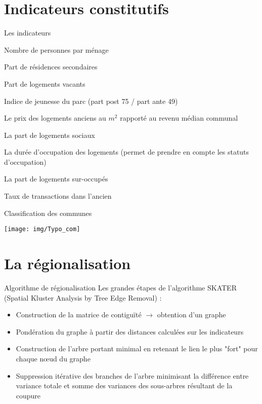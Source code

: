 \documentclass[11pt]{beamer}
\begin{document}
\section{ Indicateurs constitutifs}

\begin{frame}{Les indicateurs}

\begin{enumerate}
\small{
\item Nombre de personnes par ménage
\item Part de résidences secondaires
\item Part de logements vacants
\item Indice de jeunesse du parc (part post 75 / part ante 49)
\item Le prix des logements anciens au $m^2$  rapporté au revenu médian communal
\item La part de logements sociaux
\item La durée d'occupation des logements (permet de prendre en compte les statuts d'occupation)
\item La part de logements sur-occupés
\item Taux de transactions dans l'ancien
}
\end{enumerate}
\end{frame}

\begin{frame}{Classification des communes}
\begin{center}
\texttt{[image: img/Typo\_com]}
\end{center}
\end{frame}


\section{La régionalisation}

\begin{frame}{Algorithme de régionalisation}
Les grandes étapes de l'algorithme SKATER (Spatial Kluster Analysis by Tree Edge Removal) :
\begin{itemize}
\item Construction de la matrice de contiguïté $\rightarrow$ obtention d'un graphe
\item Pondération du graphe à partir des distances calculées sur les indicateurs
\item Construction de l'arbre portant minimal en retenant le lien le plus "fort" pour chaque n\oe ud du graphe 
\item Suppression itérative des branches de l'arbre minimisant la différence entre variance totale et somme des variances des sous-arbres résultant de la coupure
\end{itemize}
\end{frame}
\end{document}
